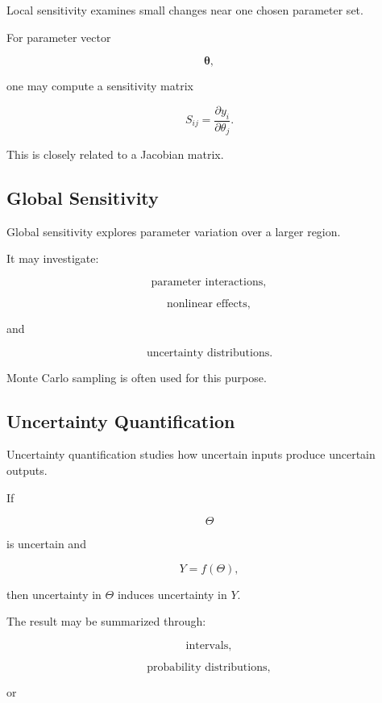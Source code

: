 Local sensitivity examines small changes near one chosen parameter set.

For parameter vector

\[
\boldsymbol{\theta},
\]

one may compute a sensitivity matrix

\[
\boxed{
S_{ij}
=
\frac{\partial y_i}{\partial\theta_j}.
}
\]

This is closely related to a Jacobian matrix.

\subsection{Global Sensitivity}
\label{subsec:global-sensitivity}

Global sensitivity explores parameter variation over a larger region.

It may investigate:

\[
\boxed{
\text{parameter interactions},
}
\]

\[
\boxed{
\text{nonlinear effects},
}
\]

and

\[
\boxed{
\text{uncertainty distributions}.
}
\]

Monte Carlo sampling is often used for this purpose.

\subsection{Uncertainty Quantification}
\label{subsec:uncertainty-quantification-modeling}

Uncertainty quantification studies how uncertain inputs produce uncertain
outputs.

If

\[
\Theta
\]

is uncertain and

\[
Y=f(\Theta),
\]

then uncertainty in \(\Theta\) induces uncertainty in \(Y\).

The result may be summarized through:

\[
\boxed{
\text{intervals},
}
\]

\[
\boxed{
\text{probability distributions},
}
\]

or

